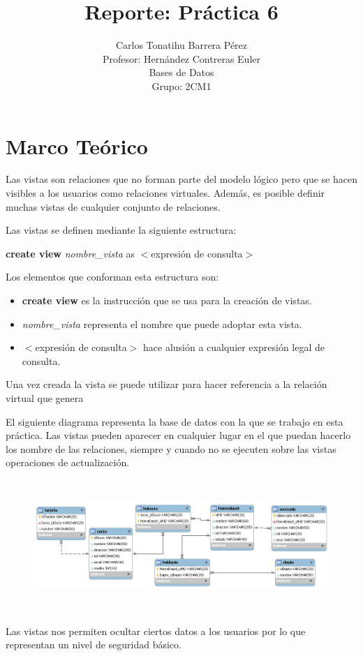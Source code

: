 \documentclass[12pt, titlepage]{article}
\title{Reporte: Práctica 6}
\author{Carlos Tonatihu Barrera Pérez \\ Profesor: Hernández Contreras Euler \\ Bases de Datos \\ Grupo: 2CM1 }
\begin{document}
	\maketitle
	\tableofcontents
	\section{Marco Teórico}
	Las vistas son relaciones que no forman parte del modelo lógico pero que se hacen visibles a los usuarios como relaciones virtuales. Además, es posible definir muchas vistas de cualquier conjunto de relaciones.\cite{LIBRO}
	
	Las vistas se definen mediante la siguiente estructura:
	\begin{center}
		\textbf{create view} \textit{nombre\_vista} as $<$expresión de consulta$>$
	\end{center}
	Los elementos que conforman esta estructura son:
	\begin{itemize}
		\item \textbf{create view} es la instrucción que se usa para la creación de vistas.
		\item \textit{nombre\_vista} representa el nombre que puede adoptar esta vista.
		\item $<$expresión de consulta$>$ hace alusión a cualquier expresión legal de consulta.
	\end{itemize}
	Una vez creada la vista se puede utilizar para hacer referencia a la relación virtual que genera
	
	El siguiente diagrama representa la base de datos con la que se trabajo en esta práctica. Las vistas pueden aparecer en cualquier lugar en el que puedan hacerlo los nombre de las relaciones, siempre y cuando no se ejecuten sobre las vistas operaciones de actualización.
	 \begin{figure}[H]
		\begin{center}
			\includegraphics[width=16cm, height=5cm]{img/home.png}
			\label{fig:home}
		\end{center}
	\end{figure}
	Las vistas nos permiten ocultar ciertos datos a los usuarios por lo que representan un nivel de seguridad básico.
\end{document}

